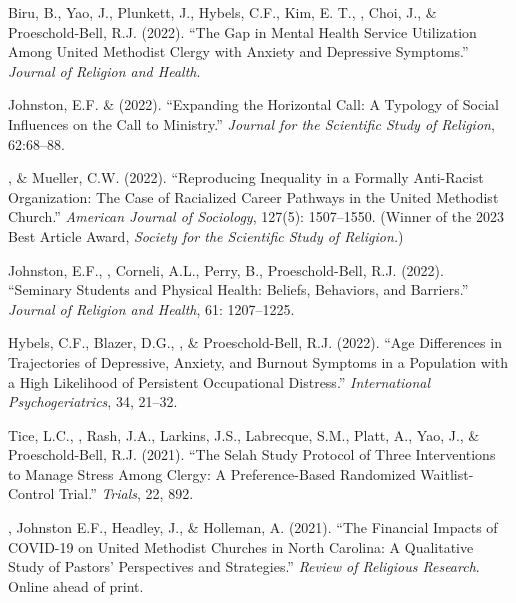 \begin{etaremune}
\item Biru, B., Yao, J., Plunkett, J., Hybels, C.F., Kim, E. T., \Eagle, Choi, J., \& Proeschold-Bell, R.J. (2022). ``The Gap in Mental Health Service Utilization Among United Methodist Clergy with Anxiety and Depressive Symptoms.'' \emph{Journal of Religion and Health}. 

\item Johnston, E.F. \& \Eagle  \hspace{.1em} (2022). ``Expanding the Horizontal Call: A Typology of Social Influences on the Call to Ministry.'' \emph{Journal for the Scientific Study of Religion}, 62:68--88.  

\item \Eagle, \& Mueller, C.W. \hspace{.1em} (2022). ``Reproducing Inequality in a Formally Anti-Racist Organization: The Case of Racialized Career Pathways in the United Methodist Church.'' \emph{American Journal of Sociology}, 127(5): 1507–1550.  (Winner of the 2023 Best Article Award, \textit{Society for the Scientific Study of Religion.})

\item Johnston, E.F., \Eagle, Corneli, A.L., Perry, B., Proeschold-Bell, R.J.  (2022). ``Seminary Students and Physical Health: Beliefs, Behaviors, and Barriers.'' \emph{Journal of Religion and Health}, 61: 1207--1225. 

\item Hybels, C.F., Blazer, D.G., \Eagle, \& Proeschold-Bell, R.J. (2022). ``Age Differences in Trajectories of Depressive, Anxiety, and Burnout Symptoms in a Population with a High Likelihood of Persistent Occupational Distress.'' \emph{International Psychogeriatrics}, 34, 21--32. 

\item Tice, L.C., \Eagle, Rash, J.A., Larkins, J.S., Labrecque, S.M., Platt, A., Yao, J., \& Proeschold-Bell, R.J. (2021). ``The Selah Study Protocol of Three Interventions to Manage Stress Among Clergy: A Preference-Based Randomized Waitlist-Control Trial.''  \emph{Trials}, 22, 892. 

\item \Eagle, Johnston E.F., Headley, J., \& Holleman, A. (2021). ``The Financial Impacts of COVID-19 on United Methodist Churches in North Carolina: A Qualitative Study of Pastors’ Perspectives and Strategies.'' \emph{Review of Religious Research}. Online ahead of print. 


\end{etaremune}
